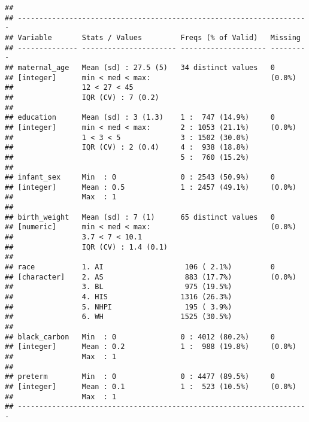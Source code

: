 \documentclass[
]{article}
\begin{document}
\begin{verbatim}
## 
## --------------------------------------------------------------------
## Variable       Stats / Values         Freqs (% of Valid)   Missing  
## -------------- ---------------------- -------------------- ---------
## maternal_age   Mean (sd) : 27.5 (5)   34 distinct values   0        
## [integer]      min < med < max:                            (0.0%)   
##                12 < 27 < 45                                         
##                IQR (CV) : 7 (0.2)                                   
## 
## education      Mean (sd) : 3 (1.3)    1 :  747 (14.9%)     0        
## [integer]      min < med < max:       2 : 1053 (21.1%)     (0.0%)   
##                1 < 3 < 5              3 : 1502 (30.0%)              
##                IQR (CV) : 2 (0.4)     4 :  938 (18.8%)              
##                                       5 :  760 (15.2%)              
## 
## infant_sex     Min  : 0               0 : 2543 (50.9%)     0        
## [integer]      Mean : 0.5             1 : 2457 (49.1%)     (0.0%)   
##                Max  : 1                                             
## 
## birth_weight   Mean (sd) : 7 (1)      65 distinct values   0        
## [numeric]      min < med < max:                            (0.0%)   
##                3.7 < 7 < 10.1                                       
##                IQR (CV) : 1.4 (0.1)                                 
## 
## race           1. AI                   106 ( 2.1%)         0        
## [character]    2. AS                   883 (17.7%)         (0.0%)   
##                3. BL                   975 (19.5%)                  
##                4. HIS                 1316 (26.3%)                  
##                5. NHPI                 195 ( 3.9%)                  
##                6. WH                  1525 (30.5%)                  
## 
## black_carbon   Min  : 0               0 : 4012 (80.2%)     0        
## [integer]      Mean : 0.2             1 :  988 (19.8%)     (0.0%)   
##                Max  : 1                                             
## 
## preterm        Min  : 0               0 : 4477 (89.5%)     0        
## [integer]      Mean : 0.1             1 :  523 (10.5%)     (0.0%)   
##                Max  : 1                                             
## --------------------------------------------------------------------
\end{verbatim}
\end{document}
